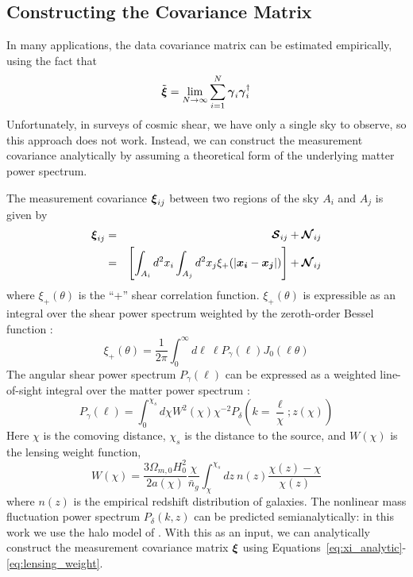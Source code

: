 \subsection{Constructing the Covariance Matrix}
In many applications, the data covariance matrix can be estimated
empirically, using the fact that
\begin{equation}
  \tilde{\boldsymbol{\xi}} = \lim_{N\to\infty} \sum_{i=1}^N 
  \boldsymbol{\gamma}_i \boldsymbol{\gamma}_i^\dagger
\end{equation}
Unfortunately, in surveys of cosmic shear, we have only a single sky to
observe, so this approach does not work.  Instead, we can construct the
measurement covariance analytically by assuming a theoretical form of the
underlying matter power spectrum.

The measurement covariance $\boldsymbol{\xi}_{ij}$ between two regions of the
sky $A_i$ and $A_j$ is given by
\begin{eqnarray}
  \label{eq:xi_analytic}
  \boldsymbol{\xi}_{ij} 
  &=& \boldsymbol{\mathcal{S}}_{ij} + \boldsymbol{\mathcal{N}}_{ij} \nonumber\\
  &=& \left[\int_{A_i}d^2x_i\int_{A_j}d^2x_j 
    \xi_+(|\boldsymbol{x_i}-\boldsymbol{x_j}|)\right]
  + \boldsymbol{\mathcal{N}}_{ij}
\end{eqnarray}
where $\xi_+(\theta)$ is the ``+'' shear correlation function. 
$\xi_+(\theta)$ is expressible as an integral over the shear power spectrum
weighted by the zeroth-order Bessel function
\citep[see, e.g.][]{Schneider02}:
\begin{equation}
  \label{eq:xi_plus_def}
  \xi_+(\theta) 
  = \frac{1}{2\pi} \int_0^\infty d\ell\ \ell P_\gamma(\ell) J_0(\ell\theta)
\end{equation}
The angular shear power spectrum $P_\gamma(\ell)$ can be expressed as a
weighted line-of-sight integral over the matter power 
spectrum \citep[see, e.g.][]{Takada04}:
\begin{equation}
  \label{eq:P_gamma}
  P_\gamma(\ell) = \int_0^{\chi_s}d\chi W^2(\chi)\chi^{-2}
  P_\delta\left(k=\frac{\ell}{\chi};z(\chi)\right)
\end{equation}
Here $\chi$ is the comoving distance, $\chi_s$ is the distance to the
source, and $W(\chi)$ is the lensing weight function,
\begin{equation}
  \label{eq:lensing_weight}
  W(\chi) = \frac{3\Omega_{m,0}H_0^2}{2a(\chi)}\frac{\chi}{\bar{n}_g}
  \int_{\chi}^{\chi_s}dz\ n(z) \frac{\chi(z)-\chi}{\chi(z)}
\end{equation}
where $n(z)$ is the empirical redshift distribution of galaxies.
The nonlinear mass fluctuation power spectrum $P_\delta(k, z)$ can be
predicted semianalytically: in this work we use the halo model of
\citet{Smith03}.  With this as an input, we can analytically
construct the measurement covariance matrix $\boldsymbol{\xi}$ using 
Equations~\ref{eq:xi_analytic}-\ref{eq:lensing_weight}.

